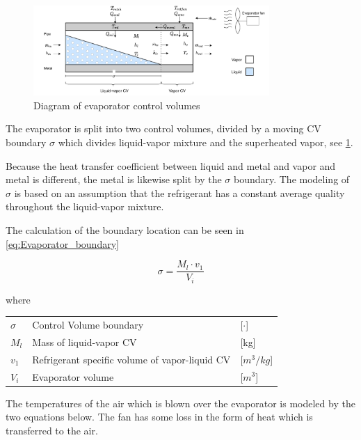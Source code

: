 \clearpage

\begin{figure}[h!]
	\centering
	\includegraphics[width=0.8\textwidth]{Graphics/Evaporator_CV_diagram.pdf}
	\caption{Diagram of evaporator control volumes}
	\label{fig:evapo_CV}
\end{figure}

The evaporator is split into two control volumes, divided by a moving CV boundary $\sigma$ which divides liquid-vapor mixture and the superheated vapor, see \cref{fig:evapo_CV}.

Because the heat transfer coefficient between liquid and metal and vapor and metal is different, the metal is likewise split by the $\sigma$ boundary. The modeling of $\sigma$ is based on an assumption that the refrigerant has a constant average quality throughout the liquid-vapor mixture.

The calculation of the boundary location can be seen in \cref{eq:Evaporator_boundary}

\begin{equation} \label{eq:Evaporator_boundary}
	\sigma = \frac{M_l \cdot v_1}{V_i}
\end{equation}

where

\begin{center}
	\begin{tabular}{l p{8cm} l}
		$\sigma$ & Control Volume boundary                        & [$\cdot$]            \\
		$M_l$    & Mass of liquid-vapor CV                        & [\si{kg}]            \\
		$v_1$    & Refrigerant specific volume of vapor-liquid CV & [$\si{m}^3/\si{kg}$] \\
		$V_i$    & Evaporator volume                              & [$\si{m}^3$]
	\end{tabular}
\end{center}

\medskip
The temperatures of the air which is blown over the evaporator is modeled by the two equations below. The fan has some loss in the form of heat which is transferred to the air.

